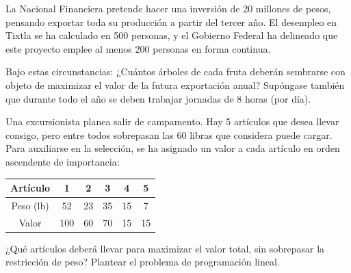 \begin{Ejer}
La Nacional Financiera pretende hacer una inversi\'on de 20 millones de pesos, pensando exportar toda su producci\'on a partir del tercer a\~no. El desempleo en Tixtla se ha calculado en 500 personas, y el Gobierno Federal ha delineado que este proyecto emplee al menos 200 personas en forma continua.

Bajo estas circunstancias: ¿Cu\'antos \'arboles de cada fruta deber\'an sembrarse con objeto de maximizar el valor de la futura exportaci\'on anual? Sup\'ongase tambi\'en que durante todo el a\~no se deben trabajar jornadas de 8 horas (por d\'ia).
\end{Ejer}


\begin{Ejer}
Una excursionista planea salir de campamento. Hay 5 art\'iculos que desea llevar consigo, pero entre todos sobrepasan las 60 libras que considera puede cargar. Para auxiliarse en la selecci\'on, se ha asignado un valor a cada art\'iculo en orden ascendente de importancia:

\begin{center}
\begin{tabular}{c|ccccc}
Art\'iculo & 1 & 2 & 3 & 4 & 5 \\
\hline
Peso (lb) & 52 & 23 & 35 & 15 & 7 \\
Valor & 100 & 60 & 70 & 15 & 15 \\
\end{tabular}
\end{center}

¿Qu\'e art\'iculos deber\'a llevar para maximizar el valor total, sin sobrepasar la restricci\'on de peso? Plantear el problema de programaci\'on lineal.
\end{Ejer}


